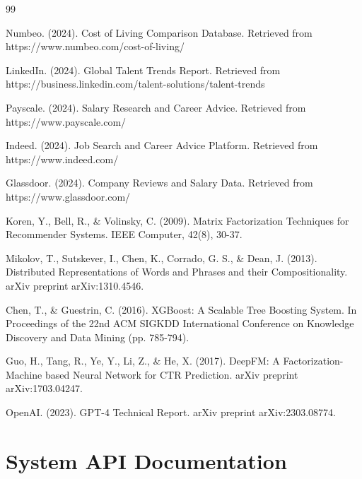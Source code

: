\newpage
\begin{thebibliography}{99}

 Numbeo. (2024). Cost of Living Comparison Database. Retrieved from https://www.numbeo.com/cost-of-living/

 LinkedIn. (2024). Global Talent Trends Report. Retrieved from https://business.linkedin.com/talent-solutions/talent-trends

 Payscale. (2024). Salary Research and Career Advice. Retrieved from https://www.payscale.com/

 Indeed. (2024). Job Search and Career Advice Platform. Retrieved from https://www.indeed.com/

 Glassdoor. (2024). Company Reviews and Salary Data. Retrieved from https://www.glassdoor.com/

 Koren, Y., Bell, R., \& Volinsky, C. (2009). Matrix Factorization Techniques for Recommender Systems. IEEE Computer, 42(8), 30-37.

 Mikolov, T., Sutskever, I., Chen, K., Corrado, G. S., \& Dean, J. (2013). Distributed Representations of Words and Phrases and their Compositionality. arXiv preprint arXiv:1310.4546.

 Chen, T., \& Guestrin, C. (2016). XGBoost: A Scalable Tree Boosting System. In Proceedings of the 22nd ACM SIGKDD International Conference on Knowledge Discovery and Data Mining (pp. 785-794).

 Guo, H., Tang, R., Ye, Y., Li, Z., \& He, X. (2017). DeepFM: A Factorization-Machine based Neural Network for CTR Prediction. arXiv preprint arXiv:1703.04247.

 OpenAI. (2023). GPT-4 Technical Report. arXiv preprint arXiv:2303.08774.

\end{thebibliography}

\appendix

\chapter{System API Documentation}

